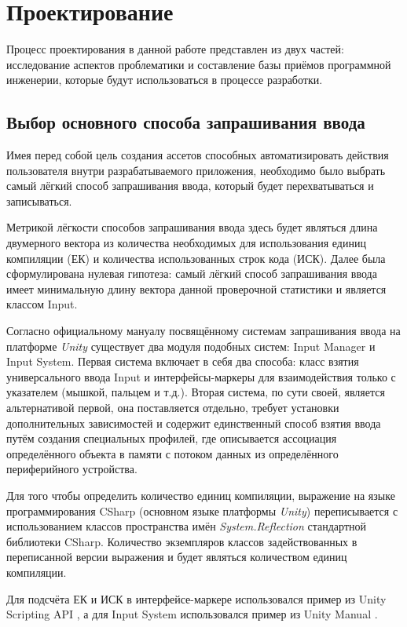 \chapter{Проектирование}
\label{cha:ch_1}

Процесс проектирования в данной работе представлен из двух частей: исследование аспектов проблематики и составление базы приёмов программной инженерии, которые будут использоваться в процессе разработки.

\section{Выбор основного способа запрашивания ввода}
Имея перед собой цель создания ассетов способных автоматизировать действия пользователя внутри разрабатываемого приложения, необходимо было выбрать самый лёгкий способ запрашивания ввода, который будет перехватываться и записываться.

Метрикой лёгкости способов запрашивания ввода здесь будет являться длина двумерного вектора из количества необходимых для использования единиц компиляции (ЕК) и количества использованных строк кода (ИСК). Далее была сформулирована нулевая гипотеза: самый лёгкий способ запрашивания ввода имеет минимальную длину вектора данной проверочной статистики и является классом Input.

Согласно официальному мануалу посвящённому системам запрашивания ввода \cite{unity_input_systems} на платформе \textit{Unity} существует два модуля подобных систем: Input Manager и Input System. Первая система включает в себя два способа: класс взятия универсального ввода Input и интерфейсы-маркеры для взаимодействия только с указателем (мышкой, пальцем и т.д.). Вторая система, по сути своей, является альтернативой первой, она поставляется отдельно, требует установки дополнительных зависимостей и содержит единственный способ взятия ввода путём создания специальных профилей, где описывается ассоциация определённого объекта в памяти с потоком данных из определённого периферийного устройства.

Для того чтобы определить количество единиц компиляции, выражение на языке программирования CSharp (основном языке платформы \textit{Unity}) переписывается с использованием классов пространства имён \textit{System.Reflection} стандартной библиотеки CSharp. Количество экземпляров классов задействованных в переписанной версии выражения и будет являться количеством единиц компиляции.

Для подсчёта ЕК и ИСК в интерфейсе-маркере использовался пример из Unity Scripting API \cite{unity_interface}, а для Input System использовался пример из Unity Manual \cite{unity_is}.

